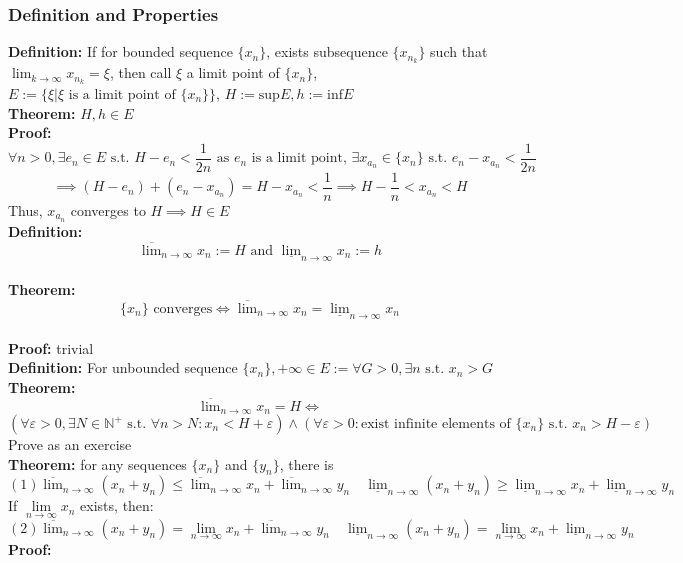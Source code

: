 \documentclass{article}
\newcommand{\st}{\mbox{ s.t. }}
\newcommand{\0}{{\bf{0}}}
\begin{document}
\subsubsection{Definition and Properties}
\textbf{Definition:} If for bounded sequence $\{x_n\}$, exists subsequence $\{x_{n_k}\}$ such that $\lim_{k\to\infty}x_{n_k}=\xi$, then call $\xi$ a limit point of $\{x_n\}$, $E:=\{\xi|\xi\mbox{ is a limit point of }\{x_n\}\}$, $H:=\mbox{sup}E,h:=\mbox{inf}E$\\
\textbf{Theorem:} $H,h\in E$\\
\textbf{Proof:}
$$\forall n>0,\exists e_n\in E\st H-e_n<\frac{1}{2n}\mbox{ as }e_n\mbox{ is a limit point, }\exists x_{a_n}\in\{x_n\}\st e_n-x_{a_n}<\frac{1}{2n}$$
$$\implies(H-e_n)+(e_n-x_{a_n})=H-x_{a_n}<\frac{1}{n}\implies H-\frac{1}{n}<x_{a_n}<H$$
Thus, $x_{a_n}$ converges to $H\implies H\in E$\\
\textbf{Definition:} $$\overline{\lim}_{n\to\infty}x_n:=H\mbox{ and }\underline{\lim}_{n\to\infty}x_n:=h$$\\
\textbf{Theorem:}
$$\{x_n\}\mbox{ converges}\iff\overline{\lim}_{n\to\infty}x_n=\underline{\lim}_{n\to\infty}x_n$$\\
\textbf{Proof:} trivial\\
\textbf{Definition:} For unbounded sequence $\{x_n\},+\infty\in E:=\forall G>0,\exists n\st x_n>G$\\
\textbf{Theorem:}
$$\overline{\lim}_{n\to\infty}x_n=H\iff$$
$$(\forall\varepsilon>0,\exists N\in\mathbb{N^+}\st\forall n>N:x_n<H+\varepsilon)\land(\forall\varepsilon>0:\mbox{exist infinite elements of }\{x_n\}\st x_n>H-\varepsilon)$$
\null\hfill{Prove as an exercise}\\
\textbf{Theorem:} for any sequences $\{x_n\}$ and $\{y_n\}$, there is
$$(1)\overline{\lim}_{n\to\infty}(x_n+y_n)\leq\overline{\lim}_{n\to\infty}x_n+\overline{\lim}_{n\to\infty}y_n\quad\underline{\lim}_{n\to\infty}(x_n+y_n)\geq\underline{\lim}_{n\to\infty}x_n+\underline{\lim}_{n\to\infty}y_n$$
If $\lim\limits_{n\to\infty}x_n$ exists, then:
$$(2)\overline{\lim}_{n\to\infty}(x_n+y_n)=\lim_{n\to\infty} x_n+\overline{\lim}_{n\to\infty}y_n\quad\underline{\lim}_{n\to\infty}(x_n+y_n)=\lim_{n\to\infty}x_n+\underline{\lim}_{n\to\infty}y_n$$
\textbf{Proof:}
\end{document}
